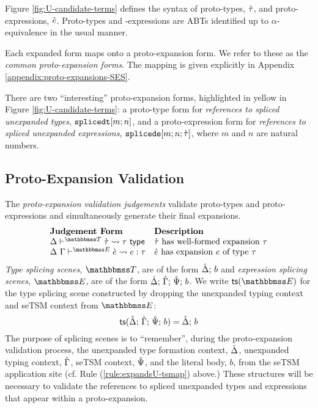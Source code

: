 Figure \ref{fig:U-candidate-terms} defines the syntax of proto-types, $\grave{\tau}$, and proto-expressions, $\grave{e}$. Proto-types and -expressions are ABTs identified up to $\alpha$-equivalence in the usual manner.

Each expanded form maps onto a proto-expansion form. We refer to these as the \emph{common proto-expansion forms}. The mapping is given explicitly in Appendix \ref{appendix:proto-expansions-SES}.

There are two ``interesting'' proto-expansion forms, highlighted in yellow in Figure \ref{fig:U-candidate-terms}: a proto-type form for \emph{references to spliced unexpanded types}, $\texttt{splicedt}[m; n]$, and a proto-expression form for \emph{references to spliced unexpanded expressions}, $\texttt{splicede}[m; n; \grave{\tau}]$, where $m$ and $n$ are natural numbers.%

\subsection{Proto-Expansion Validation}\label{sec:ce-validation-U}



The \emph{proto-expansion validation judgements} validate proto-types and proto-expressions and simultaneously generate their final expansions.%
\[\begin{array}{ll}
\textbf{Judgement Form} & \textbf{Description}\\
\cvalidT{\Delta}{\tscenev}{\ctau}{\tau} & \text{$\ctau$ has well-formed expansion $\tau$}\\
\cvalidE{\Delta}{\Gamma}{\escenev}{\ce}{e}{\tau} & \text{$\ce$ has expansion $e$ of type $\tau$}
\end{array}\]
\emph{Type splicing scenes}, $\tscenev$, are of the form $\hat{\Delta};\,b$ and \emph{expression splicing scenes}, $\escenev$, are of the form $\hat{\Delta};\,\hat{\Gamma};\,\hat{\Psi};\,b$. We write $\tsfrom{\escenev}$ for the type splicing scene constructed by dropping the unexpanded typing context and seTSM context from $\escenev$:
\[\mathsf{ts}(\hat{\Delta};\,\hat{\Gamma};\,\hat{\Psi};\,b) = \hat{\Delta};\,b\]
The purpose of splicing scenes is to ``remember'', during the proto-expansion validation process, the unexpanded type formation context, $\hat{\Delta}$, unexpanded typing context, $\hat{\Gamma}$, seTSM context, $\hat{\Psi}$, and the literal body, $b$, from the seTSM application site (cf. Rule (\ref{rule:expandsU-tsmap}) above.) These structures will be necessary to validate the references to spliced unexpanded types and expressions that appear within a proto-expansion.


